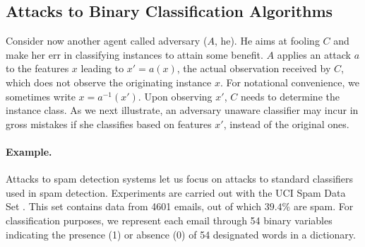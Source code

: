  

\subsection{Attacks to Binary Classification Algorithms} \label{sec:att_class}

Consider now another agent called adversary ($A$, he).
He aims at fooling $C$ and make her err in classifying instances to attain some benefit. 
$A$ applies an attack $a$ to the features $x$ leading to $x'=a(x)$, the actual observation received by $C$, which does 
not observe the originating instance $x$.
For notational convenience, we sometimes write $x=a^{-1} (x')$.
Upon observing $x'$, $C$ needs to determine the instance  class. 
As we next illustrate, an adversary unaware classifier
may incur in gross mistakes if she classifies based on features $x'$, instead of the original ones.

\paragraph{Example.} Attacks to spam detection systems let us focus on attacks to standard classifiers used in spam detection. Experiments are carried out with the UCI Spam Data Set \parencite{spambase1999}.
This set contains data from 4601 emails, out of which $39.4 \%$ are spam. For classification purposes, we represent each email through 54 binary variables indicating the presence (1) or absence (0) of 54 designated words in a dictionary.

